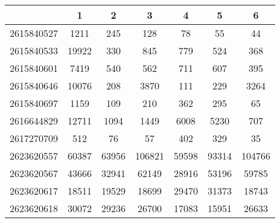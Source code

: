 \begin{tabular}{|l||c|c|c|c|c|c|}
\hline
& 1 & 2 & 3 & 4 & 5 & 6 \\
\hline
\hline
2615840527 & \cellcolor[RGB]{235, 71, 71} 1211 & \cellcolor[RGB]{235, 71, 71} 245 & \cellcolor[RGB]{253, 237, 237} 128 & \cellcolor[RGB]{241, 241, 253} 78 & \cellcolor[RGB]{227, 227, 252} 55 & \cellcolor[RGB]{223, 223, 251} 44 \\
\hline
2615840533 & \cellcolor[RGB]{235, 71, 71} 19922 & \cellcolor[RGB]{223, 223, 251} 330 & \cellcolor[RGB]{252, 232, 232} 845 & \cellcolor[RGB]{253, 241, 241} 779 & \cellcolor[RGB]{241, 241, 253} 524 & \cellcolor[RGB]{227, 227, 252} 368 \\
\hline
2615840601 & \cellcolor[RGB]{235, 71, 71} 7419 & \cellcolor[RGB]{227, 227, 252} 540 & \cellcolor[RGB]{241, 241, 253} 562 & \cellcolor[RGB]{235, 71, 71} 711 & \cellcolor[RGB]{253, 237, 237} 607 & \cellcolor[RGB]{94, 94, 237} 395 \\
\hline
2615840646 & \cellcolor[RGB]{235, 71, 71} 10076 & \cellcolor[RGB]{232, 232, 252} 208 & \cellcolor[RGB]{251, 223, 223} 3870 & \cellcolor[RGB]{232, 232, 252} 111 & \cellcolor[RGB]{232, 232, 252} 229 & \cellcolor[RGB]{252, 232, 232} 3264 \\
\hline
2615840697 & \cellcolor[RGB]{235, 71, 71} 1159 & \cellcolor[RGB]{223, 223, 251} 109 & \cellcolor[RGB]{246, 246, 254} 210 & \cellcolor[RGB]{251, 223, 223} 362 & \cellcolor[RGB]{253, 241, 241} 295 & \cellcolor[RGB]{214, 214, 250} 65 \\
\hline
2616644829 & \cellcolor[RGB]{235, 71, 71} 12711 & \cellcolor[RGB]{232, 232, 252} 1094 & \cellcolor[RGB]{237, 237, 253} 1449 & \cellcolor[RGB]{251, 223, 223} 6008 & \cellcolor[RGB]{252, 232, 232} 5230 & \cellcolor[RGB]{227, 227, 252} 707 \\
\hline
2617270709 & \cellcolor[RGB]{249, 200, 200} 512 & \cellcolor[RGB]{232, 232, 252} 76 & \cellcolor[RGB]{232, 232, 252} 57 & \cellcolor[RGB]{251, 223, 223} 402 & \cellcolor[RGB]{252, 232, 232} 329 & \cellcolor[RGB]{227, 227, 252} 35 \\
\hline
2623620557 & \cellcolor[RGB]{232, 232, 252} 60387 & \cellcolor[RGB]{237, 237, 253} 63956 & \cellcolor[RGB]{250, 214, 214} 106821 & \cellcolor[RGB]{227, 227, 252} 59598 & \cellcolor[RGB]{252, 232, 232} 93314 & \cellcolor[RGB]{251, 218, 218} 104766 \\
\hline
2623620567 & \cellcolor[RGB]{246, 246, 254} 43666 & \cellcolor[RGB]{223, 223, 251} 32941 & \cellcolor[RGB]{251, 218, 218} 62149 & \cellcolor[RGB]{214, 214, 250} 28916 & \cellcolor[RGB]{253, 241, 241} 53196 & \cellcolor[RGB]{252, 227, 227} 59785 \\
\hline
2623620617 & \cellcolor[RGB]{223, 223, 251} 18511 & \cellcolor[RGB]{252, 232, 232} 19529 & \cellcolor[RGB]{232, 232, 252} 18699 & \cellcolor[RGB]{235, 71, 71} 29470 & \cellcolor[RGB]{235, 71, 71} 31373 & \cellcolor[RGB]{232, 232, 252} 18743 \\
\hline
2623620618 & \cellcolor[RGB]{252, 232, 232} 30072 & \cellcolor[RGB]{253, 237, 237} 29236 & \cellcolor[RGB]{255, 255, 255} 26700 & \cellcolor[RGB]{218, 218, 251} 17083 & \cellcolor[RGB]{214, 214, 250} 15951 & \cellcolor[RGB]{255, 255, 255} 26633 \\
\hline
\end{tabular}
